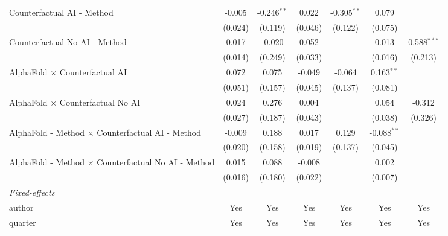 \begin{tabular}{lcccccc}
   Counterfactual AI - Method                                 & -0.005  & -0.246$^{**}$ & 0.022   & -0.305$^{**}$ & 0.079         &   \\   
                                                              & (0.024) & (0.119)       & (0.046) & (0.122)       & (0.075)       &   \\   
   Counterfactual No AI - Method                              & 0.017   & -0.020        & 0.052   &               & 0.013         & 0.588$^{***}$\\   
                                                              & (0.014) & (0.249)       & (0.033) &               & (0.016)       & (0.213)\\   
   AlphaFold $\times$ Counterfactual AI                       & 0.072   & 0.075         & -0.049  & -0.064        & 0.163$^{**}$  &   \\   
                                                              & (0.051) & (0.157)       & (0.045) & (0.137)       & (0.081)       &   \\   
   AlphaFold $\times$ Counterfactual No AI                    & 0.024   & 0.276         & 0.004   &               & 0.054         & -0.312\\   
                                                              & (0.027) & (0.187)       & (0.043) &               & (0.038)       & (0.326)\\   
   AlphaFold - Method $\times$ Counterfactual AI - Method     & -0.009  & 0.188         & 0.017   & 0.129         & -0.088$^{**}$ &   \\   
                                                              & (0.020) & (0.158)       & (0.019) & (0.137)       & (0.045)       &   \\   
   AlphaFold - Method $\times$ Counterfactual No AI - Method  & 0.015   & 0.088         & -0.008  &               & 0.002         &   \\   
                                                              & (0.016) & (0.180)       & (0.022) &               & (0.007)       &   \\   
   \midrule
   \emph{Fixed-effects}\\
   author                                                     & Yes     & Yes           & Yes     & Yes           & Yes           & Yes\\  
   quarter                                                    & Yes     & Yes           & Yes     & Yes           & Yes           & Yes\\  

\end{tabular}
